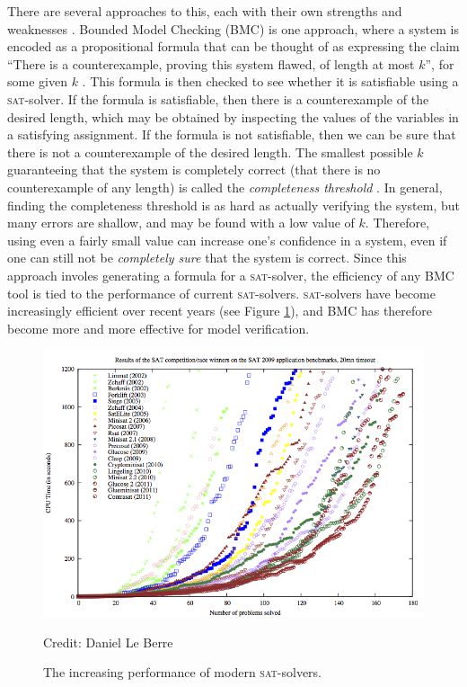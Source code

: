 \documentclass[proof,pdftex,11pt,a4,titlepage]{article}
\newcommand{\credit}[1]{\par\hfill \footnotesize Credit: #1}
\newcommand{\sat}{\textsc{sat}}
\begin{document}
There are several approaches to this, each with their own strengths and weaknesses \cite{Dsilva:2008}. Bounded Model Checking (BMC) is one approach, where a system is encoded as a propositional formula that can be thought of as expressing the claim ``There is a counterexample, proving this system flawed, of length at most $k$'', for some given $k$ \cite{Biere:1999}. This formula is then checked to see whether it is satisfiable using a \sat{}-solver. If the formula is satisfiable, then there is a counterexample of the desired length, which may be obtained by inspecting the values of the variables in a satisfying assignment. If the formula is not satisfiable, then we can be sure that there is not a counterexample of the desired length. The smallest possible $k$ guaranteeing that the system is completely correct (that there is no counterexample of any length) is called the \emph{completeness threshold} \cite{Kroening:2003}. In general, finding the completeness threshold is as hard as actually verifying the system, but many errors are shallow, and may be found with a low value of $k$. Therefore, using even a fairly small value can increase one's confidence in a system, even if one can still not be \emph{completely sure} that the system is correct. Since this approach involes generating a formula for a \sat{}-solver, the efficiency of any BMC tool is tied to the performance of current \sat{}-solvers. \sat{}-solvers have become increasingly efficient over recent years (see Figure \ref{fig:sat-solver-perf}), and BMC has therefore become more and more effective for model verification.

\begin{figure}[h]
  \includegraphics[width=\textwidth]{sat-perf}
  \credit{Daniel Le Berre}
  \caption{The increasing performance of modern \sat{}-solvers.}
  \label{fig:sat-solver-perf}
\end{figure}
\end{document}
